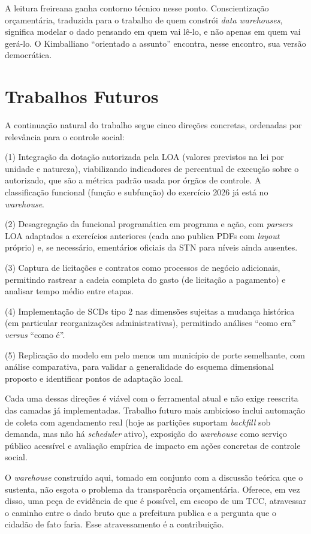 A leitura freireana ganha contorno técnico nesse ponto. Conscientização orçamentária, traduzida para o trabalho de quem constrói \textit{data warehouses}, significa modelar o dado pensando em quem vai lê-lo, e não apenas em quem vai gerá-lo. O Kimballiano ``orientado a assunto'' encontra, nesse encontro, sua versão democrática.

\section{Trabalhos Futuros}

A continuação natural do trabalho segue cinco direções concretas, ordenadas por relevância para o controle social:

(1) Integração da dotação autorizada pela LOA (valores previstos na lei por unidade e natureza), viabilizando indicadores de percentual de execução sobre o autorizado, que são a métrica padrão usada por órgãos de controle. A classificação funcional (função e subfunção) do exercício 2026 já está no \textit{warehouse}.

(2) Desagregação da funcional programática em programa e ação, com \textit{parsers} LOA adaptados a exercícios anteriores (cada ano publica PDFs com \textit{layout} próprio) e, se necessário, ementários oficiais da STN para níveis ainda ausentes.

(3) Captura de licitações e contratos como processos de negócio adicionais, permitindo rastrear a cadeia completa do gasto (de licitação a pagamento) e analisar tempo médio entre etapas.

(4) Implementação de SCDs tipo 2 nas dimensões sujeitas a mudança histórica (em particular reorganizações administrativas), permitindo análises ``como era'' \textit{versus} ``como é''.

(5) Replicação do modelo em pelo menos um município de porte semelhante, com análise comparativa, para validar a generalidade do esquema dimensional proposto e identificar pontos de adaptação local.

Cada uma dessas direções é viável com o ferramental atual e não exige reescrita das camadas já implementadas. Trabalho futuro mais ambicioso inclui automação de coleta com agendamento real (hoje as partições suportam \textit{backfill} sob demanda, mas não há \textit{scheduler} ativo), exposição do \textit{warehouse} como serviço público acessível e avaliação empírica de impacto em ações concretas de controle social.

O \textit{warehouse} construído aqui, tomado em conjunto com a discussão teórica que o sustenta, não esgota o problema da transparência orçamentária. Oferece, em vez disso, uma peça de evidência de que é possível, em escopo de um TCC, atravessar o caminho entre o dado bruto que a prefeitura publica e a pergunta que o cidadão de fato faria. Esse atravessamento é a contribuição.
